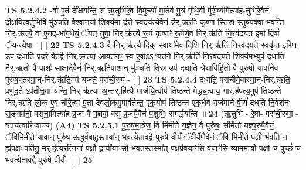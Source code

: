\documentclass[17pt]{extarticle}
\begin{document}
                                \textbf{ TS 5.2.4.2} \newline
                  -र्वा ए॒तं दी᳚क्षयन्ति॒ स ऋ॒तुभि॑रे॒व वि॒मुच्यो॑ मा॒तेव॑ पु॒त्रं पृ॑थि॒वी पु॑री॒ष्य॑मित्या॑ह॒-र्तुभि॑रे॒वैनं॑ दीक्षयि॒त्वर्तुभि॒र्वि मु॑ञ्चति वैश्वान॒र्या शि॒क्य॑मा द॑त्ते स्व॒दय॑त्ये॒वैन॑-न्नैर्.ऋ॒तीः कृ॒ष्णा-स्ति॒स्र-स्तुष॑पक्वा भवन्ति॒ निर्.ऋ॑त्यै॒ वा ए॒तद्-भा॑ग॒धेयं॒ ॅयत् तुषा॒ निर्.ऋ॑त्यै रू॒पं कृ॒ष्णꣳ रू॒पेणै॒व निर्.ऋ॑तिं नि॒रव॑दयत इ॒मां दिशं॑ ॅयन्त्ये॒षा - [  ] \textbf{  22} \newline
                  \newline
                                \textbf{ TS 5.2.4.3} \newline
                  वै निर्.ऋ॑त्यै॒ दिक् स्वाया॑मे॒व दि॒शि निर्.ऋ॑तिं नि॒रव॑दयते॒ स्वकृ॑त॒ इरि॑ण॒ उप॑ दधाति प्रद॒रे वै॒तद्वै निर्.ऋ॑त्या आ॒यत॑नꣳ॒॒ स्व ए॒वाऽऽ*यत॑ने॒ निर्.ऋ॑तिं नि॒रव॑दयते शि॒क्य॑म॒भ्युप॑ दधाति नैर्.ऋ॒तो वै पाशः॑ सा॒क्षादे॒वैनं॑ निर्.ऋतिपा॒शान्-मु॑ञ्चति ति॒स्र उप॑ दधाति त्रेधाविहि॒तो वै पुरु॑षो॒ यावा॑ने॒व पुरु॑ष॒स्तस्मा॒न्-निर्.ऋ॑ति॒मव॑ यजते॒ परा॑ची॒रुप॑ - [  ] \textbf{  23} \newline
                  \newline
                                \textbf{ TS 5.2.4.4} \newline
                  दधाति॒ परा॑चीमे॒वास्मा॒न्-निर्.ऋ॑तिं॒ प्रणु॑द॒ते ऽप्र॑तीक्ष॒मा य॑न्ति॒ निर्.ऋ॑त्या अ॒न्तर्.हि॑त्यै मार्जयि॒त्वोप॑ तिष्ठन्ते मेद्ध्य॒त्वाय॒ गार्.ह॑पत्य॒मुप॑ तिष्ठन्ते निर्.ऋति लो॒क ए॒व च॑रि॒त्वा पू॒ता दे॑वलो॒कमु॒पाव॑र्तन्त॒ एक॒योप॑ तिष्ठन्त एक॒धैव यज॑माने वी॒र्यं॑ दधति नि॒वेश॑नः स॒ङ्गम॑नो॒ वसू॑ना॒मित्या॑ह प्र॒जा वै प॒शवो॒ वसु॑ प्र॒जयै॒वैनं॑ प॒शुभिः॒ सम॑र्द्धयन्ति ॥ \textbf{  24} \newline
                  \newline
                      (ऋ॒तुभि॑ - रे॒षा- परा॑ची॒रुपा॒ - ष्टाच॑त्वारिꣳशच्च)  \textbf{(A4)} \newline \newline
                                        \textbf{ TS 5.2.5.1} \newline
                  पु॒रु॒ष॒मा॒त्रेण॒ वि मि॑मीते य॒ज्ञेन॒ वै पुरु॑षः॒ संमि॑तो यज्ञ्प॒रुषै॒वैनं॒ ॅविमि॑मीते॒ यावा॒न् पुरु॑ष ऊ॒र्द्ध्वबा॑हु॒स्तावा᳚न् भवत्ये॒ताव॒द्वै पुरु॑षे वी॒र्यं॑ ॅवी॒र्ये॑णै॒वैनं॒ ॅवि मि॑मीते प॒क्षी भ॑वति॒ न ह्य॑प॒क्षः पति॑तु॒-मर्.ह॑त्यर॒त्निना॑ प॒क्षौ द्राघी॑याꣳसौ भवत॒स्तस्मा᳚त् प॒क्षप्र॑वयाꣳसि॒ वयाꣳ॑सि व्याममा॒त्रौ प॒क्षौ च॒ पुच्छं॑ च भवत्ये॒ताव॒द्वै पुरु॑षे वी॒र्यं॑ - [  ] \textbf{  25} \newline
\end{document}
